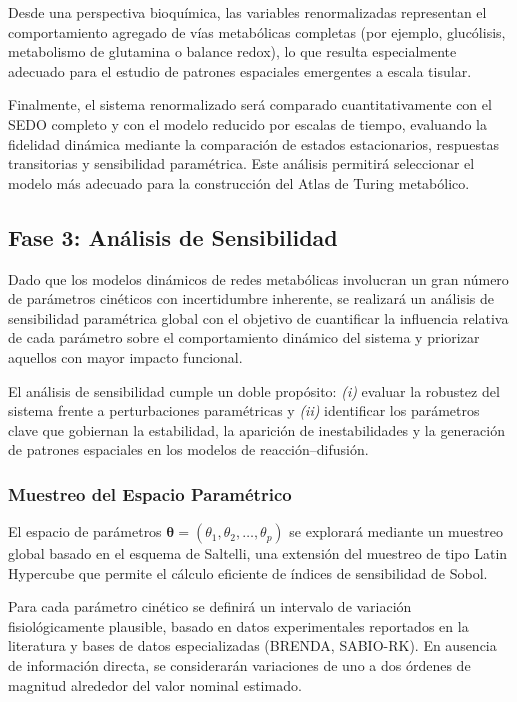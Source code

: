 \documentclass[12pt,spanish]{article}
\begin{document}
	Desde una perspectiva bioquímica, las variables renormalizadas representan el comportamiento agregado de vías metabólicas completas (por ejemplo, glucólisis, metabolismo de glutamina o balance redox), lo que resulta especialmente adecuado para el estudio de patrones espaciales emergentes a escala tisular.
	
	Finalmente, el sistema renormalizado será comparado cuantitativamente con el SEDO completo y con el modelo reducido por escalas de tiempo, evaluando la fidelidad dinámica mediante la comparación de estados estacionarios, respuestas transitorias y sensibilidad paramétrica. Este análisis permitirá seleccionar el modelo más adecuado para la construcción del Atlas de Turing metabólico.
	
	
	
	
		\subsection*{Fase 3: Análisis de Sensibilidad}
	
	Dado que los modelos dinámicos de redes metabólicas involucran un gran número de parámetros cinéticos con incertidumbre inherente, se realizará un análisis de sensibilidad paramétrica global con el objetivo de cuantificar la influencia relativa de cada parámetro sobre el comportamiento dinámico del sistema y priorizar aquellos con mayor impacto funcional.
	
	El análisis de sensibilidad cumple un doble propósito: \textit{(i)} evaluar la robustez del sistema frente a perturbaciones paramétricas y \textit{(ii)} identificar los parámetros clave que gobiernan la estabilidad, la aparición de inestabilidades y la generación de patrones espaciales en los modelos de reacción--difusión.
	
	\subsubsection*{Muestreo del Espacio Paramétrico}
	
	El espacio de parámetros $\boldsymbol{\theta} = (\theta_1, \theta_2, \ldots, \theta_p)$ se explorará mediante un muestreo global basado en el esquema de Saltelli, una extensión del muestreo de tipo Latin Hypercube que permite el cálculo eficiente de índices de sensibilidad de Sobol.
	
	Para cada parámetro cinético se definirá un intervalo de variación fisiológicamente plausible, basado en datos experimentales reportados en la literatura y bases de datos especializadas (BRENDA, SABIO-RK). En ausencia de información directa, se considerarán variaciones de uno a dos órdenes de magnitud alrededor del valor nominal estimado.
	
\end{document}
